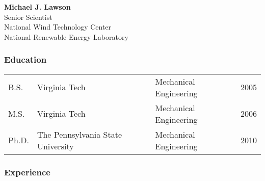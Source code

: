 \documentclass[10pt]{article}
\begin{document}
\begin{centering}
\textbf{Michael J. Lawson}\\
Senior Scientist\\
National Wind Technology Center \\
National Renewable Energy Laboratory\\
\end{centering}


\vspace{-0.0in}
\subsubsection*{Education}
\vspace{-0.1in}

\begin{tabular}{llll}
B.S. & Virginia Tech & Mechanical Engineering & 2005 \\
M.S. & Virginia Tech & Mechanical Engineering & 2006 \\
Ph.D. & The Pennsylvania State University & Mechanical Engineering & 2010 \\
\end{tabular}


\vspace{-0.2in}
\subsubsection*{Experience}
\end{document}
